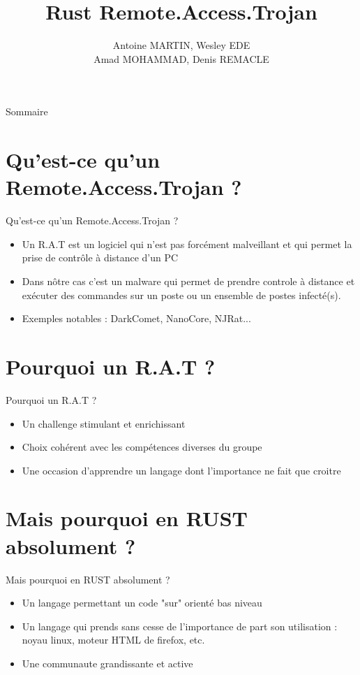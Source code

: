 \documentclass{beamer}
\title{Rust Remote.Access.Trojan}
\author{Antoine MARTIN, Wesley EDE\\Amad MOHAMMAD, Denis REMACLE}
\begin{document}
  \begin{frame}
 \maketitle
  \end{frame}

\begin{frame}{Sommaire}
    \tableofcontents
\end{frame}

\section{Qu'est-ce qu'un Remote.Access.Trojan ?}
  \begin{frame}{Qu'est-ce qu'un Remote.Access.Trojan ?}
  \begin{itemize}
	\item Un R.A.T est un logiciel qui n'est pas forcément malveillant et qui permet la prise de contrôle à distance d'un PC
	\item Dans nôtre cas c'est un malware qui permet de prendre controle à distance et exécuter des commandes sur un poste ou un ensemble de postes infecté(s).
	\newline
	\item Exemples notables : DarkComet, NanoCore, NJRat...
  \end{itemize}
  \end{frame}

\section{Pourquoi un R.A.T ?}
  \begin{frame}{Pourquoi un R.A.T ?}
  \begin{itemize}
	\item Un challenge stimulant et enrichissant
	\item Choix cohérent avec les compétences diverses du groupe
	\item Une occasion d'apprendre un langage dont l'importance ne fait que croitre
  \end{itemize}
  \end{frame}



\section{Mais pourquoi en RUST absolument ?}
  \begin{frame}{Mais pourquoi en RUST absolument ?}
  \begin{itemize}
	\item Un langage permettant un code "sur" orienté bas niveau
	\item Un langage qui prends sans cesse de l'importance de part son utilisation : noyau linux, moteur HTML de firefox, etc.
	\item Une communaute grandissante et active
  \end{itemize}
  \end{frame}
\end{document}
